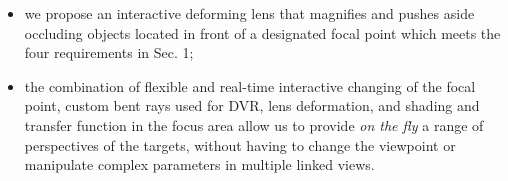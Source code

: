 \begin{itemize}
\item  we propose an interactive deforming lens that magnifies and pushes aside occluding objects located in front of a designated focal point which meets the four requirements in Sec. 1;
\item the combination of flexible and real-time interactive changing of the focal point, custom bent rays used for DVR, lens deformation, and shading and transfer function in the focus area allow us to provide \emph{on the fly} a range of perspectives of the targets, without having to change the viewpoint or manipulate complex parameters in multiple linked views.
\end{itemize}


